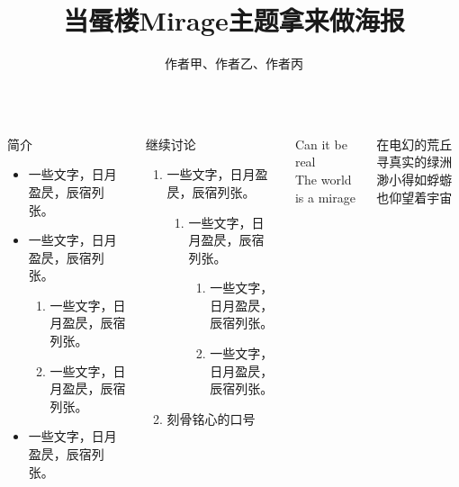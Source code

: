 \documentclass[linespread=1.4]{ctexbeamer}
\title{当蜃楼Mirage主题拿来做海报}
\author{作者甲、作者乙、作者丙}
\begin{document}
\begin{frame}

\begin{columns}[T]
\begin{block}{简介}

\begin{itemize}
    \item 一些文字，日月盈昃，辰宿列张。
    \item 一些文字，日月盈昃，辰宿列张。

\begin{enumerate}
    \item 一些文字，日月盈昃，辰宿列张。
    \item 一些文字，日月盈昃，辰宿列张。
\end{enumerate}

    \item 一些文字，日月盈昃，辰宿列张。
\end{itemize}

\end{block}

\begin{block}{继续讨论}
    \begin{enumerate}
        \item 一些文字，日月盈昃，辰宿列张。
        \begin{enumerate}
	        \item 一些文字，日月盈昃，辰宿列张。
	        \begin{enumerate}
		        \item 一些文字，日月盈昃，辰宿列张。
		        \item 一些文字，日月盈昃，辰宿列张。
	        \end{enumerate}
        \end{enumerate}
        \item \alert{刻骨铭心的口号}
    \end{enumerate}
\end{block}

\begin{pullquote}
    Can it be real\\
    The world is a mirage
\end{pullquote}

\bigskip
    
\renewcommand{\MiragePullquoteOpen}{\hskip-.2\ccwd『}
\begin{pullquote}
在电幻的荒丘　寻真实的绿洲\\
渺小得如蜉蝣　也仰望着宇宙
\end{pullquote}


\end{columns}
\end{frame}
\end{document}
